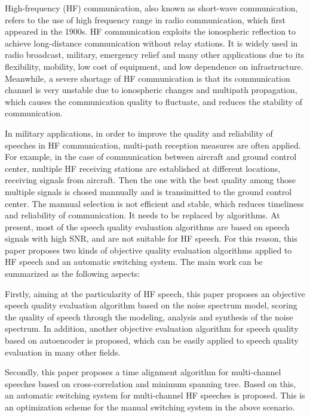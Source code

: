 \begin{eabstract}

High-frequency (HF) communication, also known as short-wave communication, refers to the use of high frequency range in radio communication, which first appeared in the 1900s. HF communication exploits the ionospheric reflection to achieve long-distance communication without relay stations. It is widely used in radio broadcast, military, emergency relief and many other applications due to its flexibility, mobility, low cost of equipment, and low dependence on infrastructure. Meanwhile, a severe shortage of HF communication is that its communication channel is very unstable due to ionospheric changes and multipath propagation, which causes the communication quality to fluctuate, and reduces the stability of communication.

In military applications, in order to improve the quality and reliability of speeches in HF communication, multi-path reception measures are often applied. For example, in the case of communication between aircraft and ground control center, multiple HF receiving stations are established at different locations, receiving signals from aircraft. Then the one with the best quality among those multiple signals is chosed mannually and is transimitted to the ground control center. The mannual selection is not efficient and stable, which reduces timeliness and reliability of communication. It needs to be replaced by algorithms. At present, most of the speech quality evaluation algorithms are based on speech signals with high SNR, and are not suitable for HF speech. For this reason, this paper proposes two kinds of objective quality evaluation algorithms applied to HF speech and an automatic switching system. The main work can be summarized as the following aspects:

Firstly, aiming at the particularity of HF speech, this paper proposes an objective speech quality evaluation algorithm based on the 
noise spectrum model, scoring the quality of speech through the modeling, analysis and synthesis of the noise spectrum. In addition, another objective evaluation algorithm for speech quality based on autoencoder is proposed, which can be easily applied to speech quality evaluation in many other fields.

Secondly, this paper proposes a time alignment algorithm for multi-channel speeches based on cross-correlation and minimum spanning tree. Based on this, an automatic switching system for multi-channel HF speeches is proposed. This is an optimization scheme for the manual switching system in the above scenario.


\end{eabstract}

